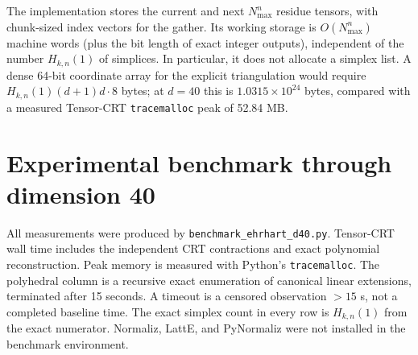 \documentclass[11pt]{article}
\begin{document}
The implementation stores the current and next $N_{\max}^n$ residue
tensors, with chunk-sized index vectors for the gather.  Its working
storage is $O(N_{\max}^n)$ machine words (plus the bit length of exact
integer outputs), independent of the number $H_{k,n}(1)$ of simplices.
In particular, it does not allocate a simplex list.  A dense 64-bit
coordinate array for the explicit triangulation would require
$H_{k,n}(1)(d+1)d\cdot8$ bytes; at $d=40$ this is
$1.0315\times10^{24}$ bytes, compared with a measured Tensor-CRT
\texttt{tracemalloc} peak of 52.84 MB.

\section{Experimental benchmark through dimension 40}

All measurements were produced by
\texttt{benchmark\_ehrhart\_d40.py}.  Tensor-CRT wall time includes the
independent CRT contractions and exact polynomial reconstruction.  Peak
memory is measured with Python's \texttt{tracemalloc}.  The polyhedral
column is a recursive exact enumeration of canonical linear extensions,
terminated after 15 seconds.  A timeout is a censored observation $>15$ s,
not a completed baseline time.  The exact simplex count in every row is
$H_{k,n}(1)$ from the exact numerator.  Normaliz, LattE, and PyNormaliz
were not installed in the benchmark environment.
\end{document}

